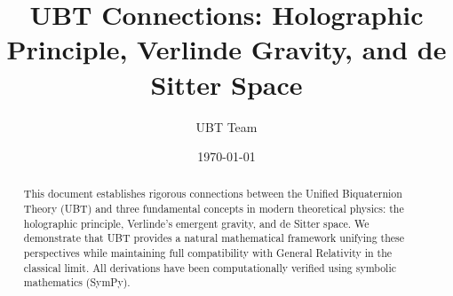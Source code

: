 \documentclass[12pt]{article}
\title{UBT Connections: Holographic Principle, Verlinde Gravity, and de Sitter Space}
\author{UBT Team}
\date{\today}
\begin{document}
\maketitle

\begin{abstract}
This document establishes rigorous connections between the Unified Biquaternion Theory (UBT) and three fundamental concepts in modern theoretical physics: the holographic principle, Verlinde's emergent gravity, and de Sitter space. We demonstrate that UBT provides a natural mathematical framework unifying these perspectives while maintaining full compatibility with General Relativity in the classical limit. All derivations have been computationally verified using symbolic mathematics (SymPy).
\end{abstract}

\tableofcontents





\end{document}
